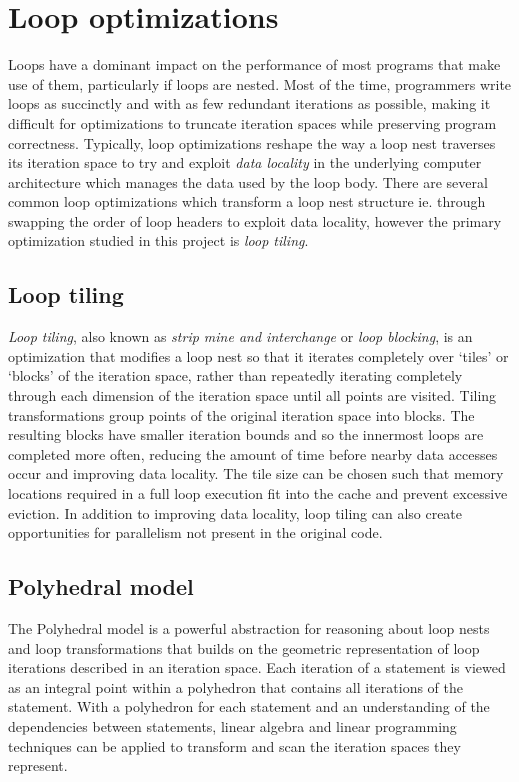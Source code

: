 \documentclass[a4paper,12pt,twoside]{report}
\begin{document}
\section{Loop optimizations}
Loops have a dominant impact on the performance of most programs that make use of them, particularly if loops are nested.
Most of the time, programmers write loops as succinctly and with as few redundant iterations as possible, making it difficult
for optimizations to truncate iteration spaces while preserving program correctness. Typically, loop optimizations reshape the
way a loop nest traverses its iteration space to try and exploit \textit{data locality} in the underlying computer architecture which
manages the data used by the loop body. There are several common loop optimizations which transform a loop nest structure ie. through
swapping the order of loop headers to exploit data locality, however the primary optimization studied in this project is \textit{loop tiling}.

\subsection{Loop tiling}
\textit{Loop tiling}, also known as \textit{strip mine and interchange} or \textit{loop blocking}\cite{dragon}, is an optimization that modifies 
a loop nest so that it iterates completely over `tiles' or `blocks' of the iteration space, rather than repeatedly iterating 
completely through each dimension of the iteration space until all points are visited. Tiling transformations group points of
the original iteration space into blocks. The resulting blocks have smaller iteration bounds and so the innermost loops are completed more often,
reducing the amount of time before nearby data accesses occur and improving data locality. The tile size can be chosen such that memory locations
required in a full loop execution fit into the cache and prevent excessive eviction. In addition to improving data locality, loop tiling can also 
create opportunities for parallelism not present in the original code.

\subsection{Polyhedral model}
The Polyhedral model is a powerful abstraction for reasoning about loop nests and loop transformations \cite{pluto} that builds on the
geometric representation of loop iterations described in an iteration space. Each iteration of a statement is viewed as an
integral point within a polyhedron that contains all iterations of the statement. With a polyhedron for each statement and an understanding
of the dependencies between statements, linear algebra and linear programming techniques can be applied to transform and scan
the iteration spaces they represent.
\end{document}
